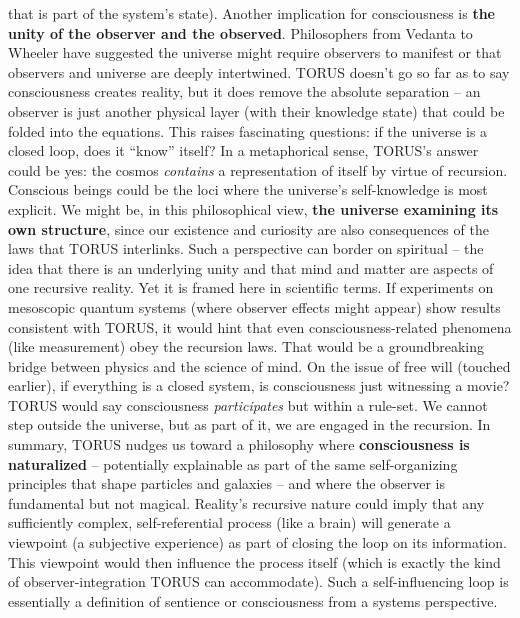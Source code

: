 \documentclass[
]{article}
\begin{document}
{\begin{itemize}
  that is part of the system's state). Another implication for
  consciousness is \textbf{the unity of the observer and the observed}.
  Philosophers from Vedanta to Wheeler have suggested the universe might
  require observers to manifest or that observers and universe are
  deeply intertwined. TORUS doesn't go so far as to say consciousness
  creates reality, but it does remove the absolute separation -- an
  observer is just another physical layer (with their knowledge state)
  that could be folded into the equations. This raises fascinating
  questions: if the universe is a closed loop, does it ``know'' itself?
  In a metaphorical sense, TORUS's answer could be yes: the cosmos
  \emph{contains} a representation of itself by virtue of recursion.
  Conscious beings could be the loci where the universe's self-knowledge
  is most explicit. We might be, in this philosophical view, \textbf{the
  universe examining its own structure}, since our existence and
  curiosity are also consequences of the laws that TORUS interlinks.
  Such a perspective can border on spiritual -- the idea that there is
  an underlying unity and that mind and matter are aspects of one
  recursive reality. Yet it is framed here in scientific terms. If
  experiments on mesoscopic quantum systems (where observer effects
  might appear)\hspace{0pt} show results consistent with TORUS, it would
  hint that even consciousness-related phenomena (like measurement) obey
  the recursion laws. That would be a groundbreaking bridge between
  physics and the science of mind. On the issue of free will (touched
  earlier), if everything is a closed system, is consciousness just
  witnessing a movie? TORUS would say consciousness \emph{participates}
  but within a rule-set. We cannot step outside the universe, but as
  part of it, we are engaged in the recursion. In summary, TORUS nudges
  us toward a philosophy where \textbf{consciousness is naturalized} --
  potentially explainable as part of the same self-organizing principles
  that shape particles and galaxies -- and where the observer is
  fundamental but not magical. Reality's recursive nature could imply
  that any sufficiently complex, self-referential process (like a brain)
  will generate a viewpoint (a subjective experience) as part of closing
  the loop on its information. This viewpoint would then influence the
  process itself (which is exactly the kind of observer-integration
  TORUS can accommodate). Such a self-influencing loop is essentially a
  definition of sentience or consciousness from a systems perspective.

\end{itemize}}
\end{document}
